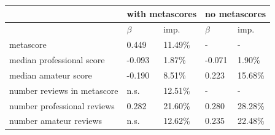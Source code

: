 \documentclass{sig-alternate}
\begin{document}
\begin{table}[tb]
\centering
\small
\sffamily


\begin{tabularx}{\linewidth}{llXlX}
& \multicolumn{2}{c}{\textbf{with metascores}} & \multicolumn{2}{c}{\textbf{no metascores}}\\ 
\midrule & \textbf{$\beta$} & imp. & \textbf{$\beta$} & imp.\\ 
metascore & 0.449 & 11.49\% & - & - \\ 
median professional score & -0.093 & 1.87\% & -0.071 & 1.90\% \\ 
median amateur score & -0.190 & 8.51\% & 0.223 & 15.68\% \\ 
number reviews in metascore & n.s. & 12.51\% & - & - \\ 
number professional reviews & 0.282 & 21.60\% & 0.280 & 28.28\% \\ 
number amateur reviews & n.s. & 12.62\% & 0.235 & 22.48\% \\ 


\end{tabularx}
\end{table}
\end{document}
